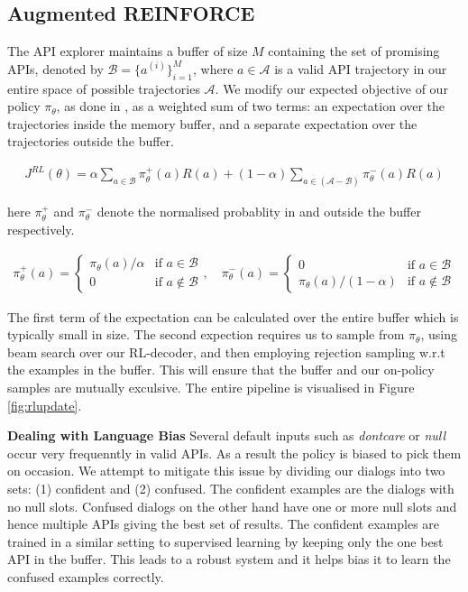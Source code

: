 \subsection{Augmented REINFORCE}
The API explorer maintains a buffer of size $M$ containing the set of promising APIs, denoted by $\mathcal{B} = \bigl\{a^{(i)}\bigr\}_{i=1}^M$, where $a \in \mathcal{A}$ is a valid API trajectory in our entire space of possible trajectories $\mathcal{A}$. We modify our expected objective of our policy $\pi_\theta$, as done in \cite{NIPS2018_8204}, as a weighted sum of two terms: an expectation over the trajectories inside the memory buffer, and a separate expectation over the trajectories outside the buffer.

\begin{gather}
J^{RL}(\theta) = \alpha\sum_{a\in\mathcal{B}}\pi^+_\theta(a)R(a) + (1-\alpha)\sum_{a\in(\mathcal{A}-\mathcal{B})}\pi^-_\theta(a)R(a) 
\end{gather}

here $\pi^+_\theta$ and $\pi^-_\theta$ denote the normalised probablity in and outside the buffer respectively.

\begin{gather}
\pi^+_\theta(a) = \begin{cases}
             \pi_\theta(a) / \alpha  & \text{if } a \in \mathcal{B} \\
             0  & \text{if } a \notin \mathcal{B}
       \end{cases}, \quad
\pi^-_\theta(a) = \begin{cases}
             0  & \text{if } a \in \mathcal{B} \\
             \pi_\theta(a) / (1-\alpha)  & \text{if } a \notin \mathcal{B}
       \end{cases}
\end{gather}

The first term of the expectation can be calculated over the entire buffer which is typically small in size. The second expection requires us to sample from $\pi_\theta$, using beam search over our RL-decoder, and then employing rejection sampling w.r.t the examples in the buffer. This will ensure that the buffer and our on-policy samples are mutually exculsive. The entire pipeline is visualised in Figure \ref{fig:rlupdate}.

\noindent\textbf{Dealing with Language Bias}
Several default inputs such as {\em dontcare} or {\em null} occur very frequenntly in valid APIs. As a result the policy is biased to pick them on occasion. We attempt to mitigate this issue by dividing our dialogs into two sets: (1) confident and (2) confused. The confident examples are the dialogs with no null slots. Confused dialogs on the other hand have one or more null slots and hence multiple APIs giving the best set of results. The confident examples are trained in a similar setting to supervised learning by keeping only the one best API in the buffer. This leads to a robust system and it helps bias it to learn the confused examples correctly.

